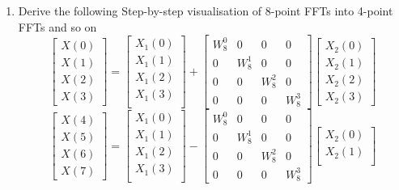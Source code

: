 \documentclass[journal,12pt,twocolumn]{IEEEtran}
\renewcommand\thesection{\arabic{section}}
\begin{document}
\begin{enumerate}[label=\arabic*.,ref=\thesection.\theenumi]
\item Derive the following Step-by-step visualisation  of
8-point FFTs into 4-point FFTs and so on
\begin{equation}
	\begin{bmatrix}
		X(0) \\ 
		X(1) \\ 
		X(2) \\ 
		X(3)
	\end{bmatrix}
	=
	\begin{bmatrix}
		X_{1}(0) \\ 
		X_{1}(1)\\ 
		X_{1}(2)\\
		X_{1}(3)\\
	\end{bmatrix}
	+
	\begin{bmatrix}
		W^{0}_{8} & 0 & 0 & 0\\
		0 & W^{1}_{8} & 0 & 0\\
		0 & 0 & W^{2}_{8} & 0\\
		0 & 0 & 0 & W^{3}_{8}
	\end{bmatrix}
	\begin{bmatrix}
		X_{2}(0) \\ 
		X_{2}(1) \\ 
		X_{2}(2) \\
		X_{2}(3)
	\end{bmatrix}
\end{equation}
\begin{equation}
	\begin{bmatrix}
		X(4) \\ 
		X(5) \\ 
		X(6) \\ 
		X(7)
	\end{bmatrix}
	=
	\begin{bmatrix}
		X_{1}(0) \\ 
		X_{1}(1)\\ 
		X_{1}(2)\\
		X_{1}(3)\\
	\end{bmatrix}
	-
	\begin{bmatrix}
		W^{0}_{8} & 0 & 0 & 0\\
		0 & W^{1}_{8} & 0 & 0\\
		0 & 0 & W^{2}_{8} & 0\\
		0 & 0 & 0 & W^{3}_{8}
	\end{bmatrix}
	\begin{bmatrix}
		X_{2}(0) \\ 
		X_{2}(1) \\ 

\end{bmatrix}
\end{equation}
\end{enumerate}
\end{document}

